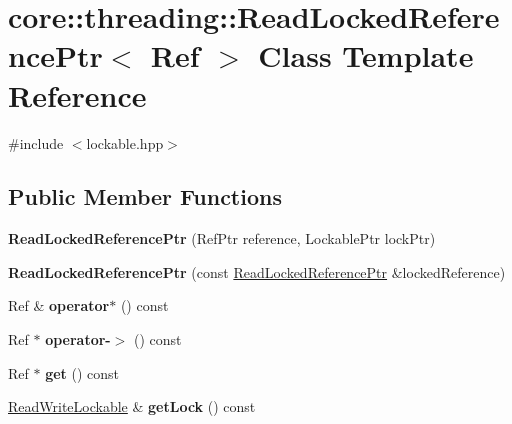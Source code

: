 \hypertarget{classcore_1_1threading_1_1_read_locked_reference_ptr}{\section{core\-:\-:threading\-:\-:Read\-Locked\-Reference\-Ptr$<$ Ref $>$ Class Template Reference}
\label{classcore_1_1threading_1_1_read_locked_reference_ptr}
}


{\ttfamily \#include $<$lockable.\-hpp$>$}

\subsection*{Public Member Functions}
\begin{DoxyCompactItemize}
\item 
\hypertarget{classcore_1_1threading_1_1_read_locked_reference_ptr_a8d1687938f0674ad87bd4813aff9aabd}{{\bfseries Read\-Locked\-Reference\-Ptr} (Ref\-Ptr reference, Lockable\-Ptr lock\-Ptr)}\label{classcore_1_1threading_1_1_read_locked_reference_ptr_a8d1687938f0674ad87bd4813aff9aabd}

\item 
\hypertarget{classcore_1_1threading_1_1_read_locked_reference_ptr_adee56a0c1e5162582adb9db505383c05}{{\bfseries Read\-Locked\-Reference\-Ptr} (const \hyperlink{classcore_1_1threading_1_1_read_locked_reference_ptr}{Read\-Locked\-Reference\-Ptr} \&locked\-Reference)}\label{classcore_1_1threading_1_1_read_locked_reference_ptr_adee56a0c1e5162582adb9db505383c05}

\item 
\hypertarget{classcore_1_1threading_1_1_read_locked_reference_ptr_a8be560b65244ab353f0abe70adaa0437}{Ref \& {\bfseries operator$\ast$} () const }\label{classcore_1_1threading_1_1_read_locked_reference_ptr_a8be560b65244ab353f0abe70adaa0437}

\item 
\hypertarget{classcore_1_1threading_1_1_read_locked_reference_ptr_a2a0a7c68221795c609636b531a455952}{Ref $\ast$ {\bfseries operator-\/$>$} () const }\label{classcore_1_1threading_1_1_read_locked_reference_ptr_a2a0a7c68221795c609636b531a455952}

\item 
\hypertarget{classcore_1_1threading_1_1_read_locked_reference_ptr_ad9d1be2e9759f1b09da2775d5aa1d3fc}{Ref $\ast$ {\bfseries get} () const }\label{classcore_1_1threading_1_1_read_locked_reference_ptr_ad9d1be2e9759f1b09da2775d5aa1d3fc}

\item 
\hypertarget{classcore_1_1threading_1_1_read_locked_reference_ptr_a7e3854c616e0e77e703fadb8fec90f17}{\hyperlink{classcore_1_1threading_1_1_read_write_lockable}{Read\-Write\-Lockable} \& {\bfseries get\-Lock} () const }\label{classcore_1_1threading_1_1_read_locked_reference_ptr_a7e3854c616e0e77e703fadb8fec90f17}

\end{DoxyCompactItemize}
